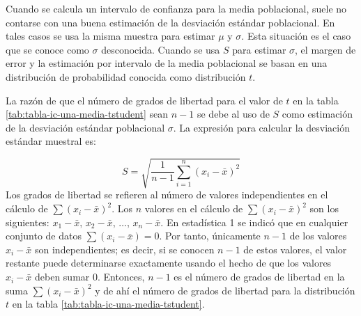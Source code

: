 \documentclass[
  11pt,
]{book}
\theoremstyle{definition}
\theoremstyle{definition}
\theoremstyle{definition}
\theoremstyle{definition}
\theoremstyle{remark}
\begin{document}
Cuando se calcula un intervalo de confianza para la media poblacional, suele no contarse con una buena estimación de la desviación estándar poblacional. En tales casos se usa la misma muestra para estimar \(\mu\) y \(\sigma\). Esta situación es el caso que se conoce como \(\sigma\) desconocida. Cuando se usa \(S\) para estimar \(\sigma\), el margen de error y la estimación por intervalo de la media poblacional se basan en una distribución de probabilidad conocida como distribución \(t\). \citep[página 307]{anderson}

La razón de que el número de grados de libertad para el valor de \(t\) en la tabla \ref{tab:tabla-ic-una-media-tstudent} sean \(n-1\) se debe al uso de \(S\) como estimación de la desviación estándar poblacional \(\sigma\). La expresión para calcular la desviación estándar muestral es:

\[
S = \sqrt{\frac{1}{n-1}\sum_{i=1}^n (x_i - \bar{x})^2}
\]
Los grados de libertad se refieren al número de valores independientes en el cálculo de \(\sum (x_i - \bar{x})^2\). Los \(n\) valores en el cálculo de \(\sum (x_i - \bar{x})^2\) son los siguientes: \(x_1 - \bar{x},\, x_2 - \bar{x},\, \ldots,\, x_n - \bar{x}\). En estadística 1 se indicó que en cualquier conjunto de datos \(\sum (x_i - \bar{x}) = 0\). Por tanto, únicamente \(n - 1\) de los valores \(x_i - \bar{x}\) son independientes; es decir, si se conocen \(n - 1\) de estos valores, el valor restante puede determinarse exactamente usando el hecho de que los valores \(x_i - \bar{x}\) deben sumar 0. Entonces, \(n - 1\) es el número de grados de libertad en la suma \(\sum (x_i - \bar{x})^2\) y de ahí el número de grados de libertad para la distribución \(t\) en la tabla \ref{tab:tabla-ic-una-media-tstudent}.

\begin{table}[H]
\centering
\caption{\label{tab:tabla-ic-una-media-tstudent}Intervalos de confianza para la media de una distribución normal y varianza poblacional desconocida}
\centering
{}
\end{table}
\end{document}
